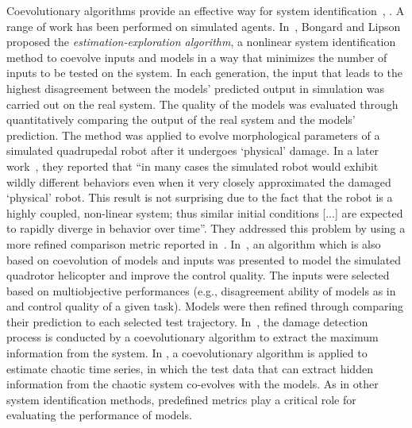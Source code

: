 Coevolutionary algorithms provide an effective way for system identification~\cite{Bongard2005}, \cite{Bongard_remote_robot_2004,Bongard_function_recovery_2004,Koos2009,Bongard2007PNAS,Mirm2011,Ly2014}. A range of work has been performed on simulated agents. In~\cite{Bongard_remote_robot_2004}, Bongard and Lipson proposed the \emph{estimation-exploration algorithm}, a nonlinear system identification method to coevolve inputs and models in a way that minimizes the number of inputs to be tested on the system. In each generation, the input that leads to the highest disagreement between the models' predicted output in simulation was carried out on the real system. The quality of the models was evaluated through quantitatively comparing the output of the real system and the models' prediction. The method was applied to evolve morphological parameters of a simulated quadrupedal robot after it undergoes `physical' damage. In a later work~\cite{Bongard_function_recovery_2004}, they reported that ``in many cases the simulated robot would exhibit wildly different behaviors even when it very closely approximated the damaged `physical' robot. This result is not surprising due to the fact that the robot is a highly coupled, non-linear system; thus similar initial conditions [...] are expected to rapidly diverge in behavior over time''. They addressed this problem by using a more refined comparison metric reported in~\cite{Bongard_function_recovery_2004}. In~\cite{Koos2009}, an algorithm which is also based on coevolution of models and inputs was presented to model the simulated quadrotor helicopter and improve the control quality. The inputs were selected based on multiobjective performances (e.g., disagreement ability of models as in ~\cite{Bongard_remote_robot_2004} and control quality of a given task). Models were then refined through comparing their prediction to each selected test trajectory. In~\cite{Kouchmeshky_2007}, the damage detection process is conducted by a coevolutionary algorithm to extract the maximum information from the system. In \cite{Mirmomeni_2011}, a coevolutionary algorithm is applied to estimate chaotic time series, in which the test data that can extract hidden information from the chaotic system co-evolves with the models. As in other system identification methods, predefined metrics play a critical role for evaluating the performance of models. 
  
